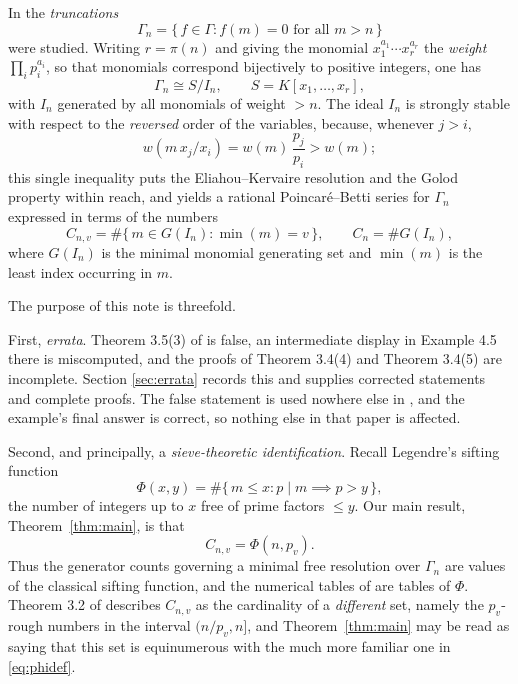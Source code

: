 \documentclass[a4paper,11pt,oneside,reqno]{amsart}
\theoremstyle{definition}
\theoremstyle{remark}
\theoremstyle{plain}
\newcommand{\Gam}{\Gamma}
\begin{document}
In \cite{Snellman2000} the \emph{truncations}
\begin{equation}
  \Gam_n = \{\,f \in \Gam : f(m) = 0\text{ for all }m > n\,\}
\end{equation}
were studied. Writing \(r = \pi(n)\) and giving the monomial
\(x_1^{a_1}\cdots x_r^{a_r}\) the \emph{weight} \(\prod_i p_i^{a_i}\), so that
monomials correspond bijectively to positive integers, one has
\begin{equation}\label{eq:GammaSI}
  \Gam_n \cong S/I_n,\qquad S = K[x_1,\dots,x_r],
\end{equation}
with \(I_n\) generated by all
monomials of weight \(>n\). The ideal \(I_n\) is strongly stable with respect to
the \emph{reversed} order of the variables, because, whenever \(j > i\),
\begin{equation}\label{eq:stable}
  w\!\left(m\,x_j/x_i\right) = w(m)\,\frac{p_j}{p_i} > w(m);
\end{equation}
this single inequality
puts the Eliahou--Kervaire resolution \cite{EliahouKervaire} and the Golod
property \cite{AramovaHerzog,Peeva,Golod,GulliksenLevin} within reach, and
yields a rational Poincaré--Betti series for \(\Gam_n\) expressed in terms of
the numbers
\begin{equation}\label{eq:Cdef}
  C_{n,v} = \#\{\,m \in G(I_n) : \min(m) = v\,\},\qquad C_n = \#G(I_n),
\end{equation}
where \(G(I_n)\) is the minimal monomial generating set and \(\min(m)\) is the
least index occurring in \(m\).

The purpose of this note is threefold.

First, \emph{errata}. Theorem 3.5(3) of \cite{Snellman2000} is false, an
intermediate display in Example 4.5 there is miscomputed, and the proofs of
Theorem 3.4(4) and Theorem 3.4(5) are incomplete. Section \ref{sec:errata}
records this and supplies corrected statements and complete proofs. The false
statement is used nowhere else in \cite{Snellman2000}, and the example's final
answer is correct, so nothing else in that paper is affected.

Second, and principally, a \emph{sieve-theoretic identification}. Recall
Legendre's sifting function
\begin{equation}\label{eq:phidef}
  \Phi(x,y) = \#\{\,m \le x : p \mid m \implies p > y\,\},
\end{equation}
the number of integers up to \(x\) free of prime factors \(\le y\). Our main
result, Theorem~\ref{thm:main}, is that
\begin{equation}
  \boxed{\;C_{n,v} = \Phi(n,p_v).\;}
\end{equation}
Thus the generator counts governing a minimal free resolution over \(\Gam_n\)
are values of the classical sifting function, and the numerical
tables of \cite{Snellman2000} are tables of \(\Phi\). Theorem 3.2 of
\cite{Snellman2000} describes \(C_{n,v}\) as the cardinality of a
\emph{different} set, namely the \(p_v\)-rough numbers in the interval
\((n/p_v,n]\), and Theorem~\ref{thm:main} may be read as saying that this
set is equinumerous with the much more familiar one in \eqref{eq:phidef}.
\end{document}
